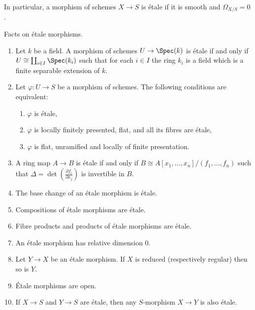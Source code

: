 \noindent
In particular, a morphism of schemes $X \to S$ is \'etale if it is smooth
and $\Omega_{X/S} = 0$.

\begin{proposition}
\label{proposition-etale-morphisms}
Facts on \'etale morphisms.
\begin{enumerate}
\item Let $k$ be a field. A morphism of schemes $U \to \Spec(k)$ is
\'etale if and only if $U \cong \coprod_{i \in I} \Spec(k_i)$
such that for each $i \in I$
the ring $k_i$ is a field which is a finite separable extension of $k$.
\item Let $\varphi : U \to S$ be a morphism of schemes. The following
conditions are equivalent:
\begin{enumerate}
\item $\varphi$ is \'etale,
\item $\varphi$ is locally finitely presented, flat, and all its fibres are
\'etale,
\item $\varphi$ is flat, unramified and locally of finite presentation.
\end{enumerate}
\item A ring map $A \to B$ is \'etale if and only if
$B \cong A[x_1, \dots, x_n]/(f_1, \dots, f_n)$
such that $\Delta = \det \left( \frac{\partial f_i}{\partial x_j} \right)$
is invertible in $B$.
\item The base change of an \'etale morphism is \'etale.
\item Compositions of \'etale morphisms are \'etale.
\item Fibre products and products of \'etale morphisms are \'etale.
\item An \'etale morphism has relative dimension 0.
\item Let $Y \to X$ be an \'etale morphism.
If $X$ is reduced (respectively regular) then so is $Y$.
\item \'Etale morphisms are open.
\item If $X \to S$ and $Y \to S$ are \'etale, then any
$S$-morphism $X \to Y$ is also \'etale.
\end{enumerate}
\end{proposition}

